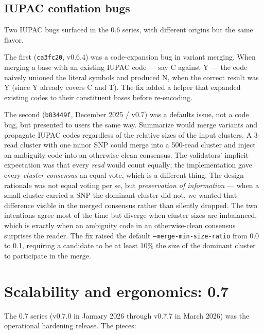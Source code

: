 \documentclass[11pt]{article}
\begin{document}
\subsection{IUPAC conflation bugs}

Two IUPAC bugs surfaced in the 0.6 series, with different origins but the same
flavor.

The first (\texttt{ca3fc20}, v0.6.4) was a code-expansion bug in variant
merging. When merging a base with an existing IUPAC code --- say C against Y
--- the code naively unioned the literal symbols and produced N, when the
correct result was Y (since Y already covers C and T). The fix added a helper
that expanded existing codes to their constituent bases before re-encoding.

The second (\texttt{b83449f}, December 2025 / v0.7) was a defaults issue, not
a code bug, but presented to users the same way. Summarize would merge
variants and propagate IUPAC codes regardless of the relative sizes of the
input clusters. A 3-read cluster with one minor SNP could merge into a
500-read cluster and inject an ambiguity code into an otherwise clean
consensus. The validators' implicit expectation was that every \emph{read}
would count equally; the implementation gave every \emph{cluster
consensus} an equal vote, which is a different thing. The design
rationale was not equal voting per se, but \emph{preservation of
information} --- when a small cluster carried a SNP the dominant cluster
did not, we wanted that difference visible in the merged consensus
rather than silently dropped. The two intentions agree most of the time
but diverge when cluster sizes are imbalanced, which is exactly when an
ambiguity code in an otherwise-clean consensus surprises the reader. The
fix raised the default \texttt{--merge-min-size-ratio} from 0.0 to 0.1,
requiring a candidate to be at least 10\% the size of the dominant
cluster to participate in the merge.

\section{Scalability and ergonomics: 0.7}
\label{sec:scalability}

The 0.7 series (v0.7.0 in January 2026 through v0.7.7 in March 2026) was the
operational hardening release. The pieces:
\end{document}
